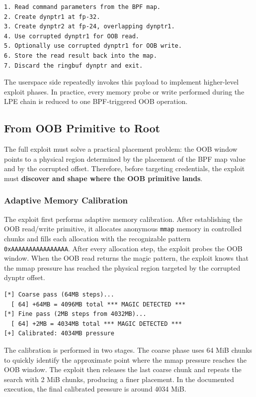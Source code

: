 \documentclass[../main.tex]{subfiles}
\begin{document}
\begin{lstlisting}[caption={High-level BPF payload flow.}]
1. Read command parameters from the BPF map.
2. Create dynptr1 at fp-32.
3. Create dynptr2 at fp-24, overlapping dynptr1.
4. Use corrupted dynptr1 for OOB read.
5. Optionally use corrupted dynptr1 for OOB write.
6. Store the read result back into the map.
7. Discard the ringbuf dynptr and exit.
\end{lstlisting}

The userspace side repeatedly invokes this payload to implement higher-level exploit phases. In practice, every memory probe or write performed during the LPE chain is reduced to one BPF-triggered OOB operation.

\subsection{From OOB Primitive to Root}

The full exploit must solve a practical placement problem: the OOB window points to a physical region determined by the placement of the BPF map value and by the corrupted offset. Therefore, before targeting credentials, the exploit must \textbf{discover and shape where the OOB primitive lands}.

\subsubsection{Adaptive Memory Calibration}

The exploit first performs adaptive memory calibration. After establishing the OOB read/write primitive, it allocates anonymous \texttt{mmap} memory in controlled chunks and fills each allocation with the recognizable pattern \texttt{0xAAAAAAAAAAAAAAAA}. After every allocation step, the exploit probes the OOB window. When the OOB read returns the magic pattern, the exploit knows that the mmap pressure has reached the physical region targeted by the corrupted dynptr offset.

\begin{lstlisting}[caption={Adaptive calibration output.}]
[*] Coarse pass (64MB steps)...
  [ 64] +64MB = 4096MB total *** MAGIC DETECTED ***
[*] Fine pass (2MB steps from 4032MB)...
  [ 64] +2MB = 4034MB total *** MAGIC DETECTED ***
[+] Calibrated: 4034MB pressure
\end{lstlisting}

The calibration is performed in two stages. The coarse phase uses 64 MiB chunks to quickly identify the approximate point where the mmap pressure reaches the OOB window. The exploit then releases the last coarse chunk and repeats the search with 2 MiB chunks, producing a finer placement. In the documented execution, the final calibrated pressure is around 4034 MiB.
\end{document}

